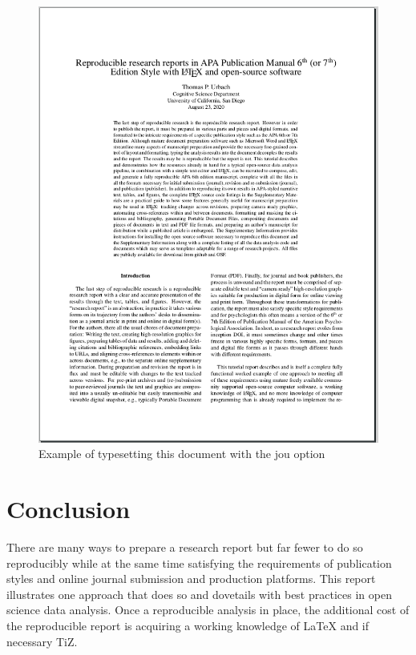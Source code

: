 \documentclass[helv,10pt,man,floatsintext]{apa6}  %
\begin{document}
\begin{figure}
\caption{Example of typesetting this document with the jou option}
\centering
\includegraphics[width=.65\textwidth]{images/apa67_jou.png}
\end{figure}


\section{Conclusion}

There are many ways to prepare a research report but far fewer to do
so reproducibly while at the same time satisfying the requirements of
publication styles and online journal submission and production
platforms.  This report illustrates one approach that does so and
dovetails with best practices in open science data analysis. Once
a reproducible analysis in place, the additional cost of the
reproducible report is acquiring a working knowledge of \LaTeX{} and
if necessary Ti{\it}Z.

\newpage
\printbibliography
\end{document}

